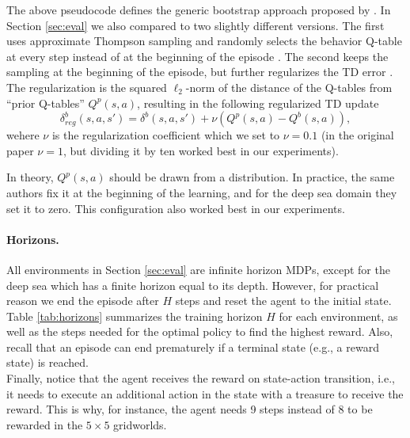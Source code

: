 \documentclass{article}
\begin{document}
The above pseudocode defines the generic bootstrap approach proposed by \citet{osband2016deep}. In Section \ref{sec:eval} we also compared to two slightly different versions. The first uses approximate Thompson sampling and randomly selects the behavior Q-table at every step instead of at the beginning of the episode \citep{deramo2019exploiting}. The second keeps the sampling at the beginning of the episode, but further regularizes the TD error \citep{osband2018randomized,osband2019deep}. The regularization is the squared $\ell_2$-norm of the distance of the Q-tables from ``prior Q-tables'' $Q^p(s,a)$, resulting in the following regularized TD update
\begin{equation}
\delta^b_{reg}(s,a,s') = \delta^b(s,a,s') + {\nu} \left(Q^p(s,a) - Q^b(s,a)\right),
\end{equation}
wehere $\nu$ is the regularization coefficient which we set to $\nu = 0.1$ (in the original paper $\nu = 1$, but dividing it by ten worked best in our experiments).

In theory, $Q^p(s,a)$ should be drawn from a distribution. In practice, the same authors fix it at the beginning of the learning, and for the deep sea domain they set it to zero. This configuration also worked best in our experiments.

\clearpage


\paragraph{Horizons.} All environments in Section \ref{sec:eval} are infinite horizon MDPs, except for the deep sea which has a finite horizon equal to its depth. However, for practical reason we end the episode after $H$ steps and reset the agent to the initial state. 
Table \ref{tab:horizons} summarizes the training horizon $H$ for each environment, as well as the steps needed for the optimal policy to find the highest reward. 
Also, recall that an episode can end prematurely if a terminal state (e.g., a reward state) is reached.
\\
Finally, notice that the agent receives the reward on state-action transition, i.e., it needs to execute an additional action in the state with a treasure to receive the reward. This is why, for instance, the agent needs 9 steps instead of 8 to be rewarded in the $5\times5$ gridworlds.
\end{document}
